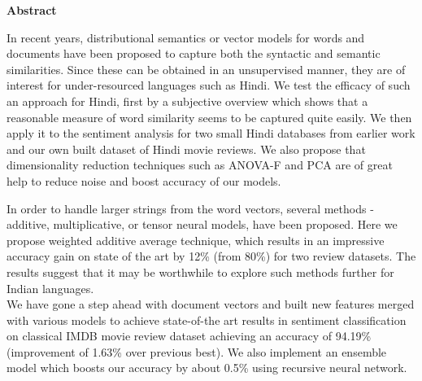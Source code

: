 \cleardoublepage

\begin{center}
	\huge{\textbf{Abstract}}
\end{center}

In recent years, distributional semantics or vector models for words and documents have been proposed to capture both the syntactic and semantic similarities. Since these can be obtained in an unsupervised manner, they are of interest for under-resourced languages such as Hindi.  We test the efficacy of such an approach for Hindi, first by a subjective overview which shows that a reasonable measure of word similarity seems to be captured quite easily.  We then apply it to the sentiment analysis for two small Hindi databases from earlier work and our own built dataset of Hindi movie reviews. We also propose that dimensionality reduction techniques such as ANOVA-F and PCA are of great help to reduce noise and boost accuracy of our models.

In order to handle larger strings from the word vectors, several methods - additive, multiplicative, or tensor neural models, have been proposed.  Here we propose weighted additive average technique, which results in an impressive accuracy gain on state of the art by 12\% (from 80\%) for two review datasets.  The results suggest that it may be worthwhile to explore such methods further for Indian languages.\\
We have gone a step ahead with document vectors and built new features merged with various models to achieve state-of-the art results in sentiment classification on classical IMDB movie review dataset achieving an accuracy of 94.19\%(improvement of 1.63\% over previous best). We also implement an ensemble model which boosts our accuracy by about 0.5\% using recursive neural network.
